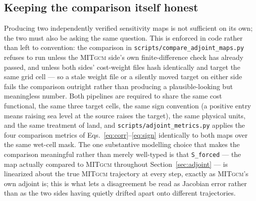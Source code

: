 \documentclass[3p,12pt]{elsarticle}
\newcommand{\MITgcm}{\textsc{MITgcm}}
\begin{document}
\subsection{Keeping the comparison itself honest}
\label{app:trust-shared}

Producing two independently verified sensitivity maps is not sufficient on
its own; the two must also be asking the same question. This is enforced in
code rather than left to convention: the comparison in
\texttt{scripts/compare\_adjoint\_maps.py} refuses to run unless the
\MITgcm{} side's own finite-difference check has already passed, and unless
both sides' cost-weight files hash identically and target the same grid cell
--- so a stale weight file or a silently moved target on either side fails
the comparison outright rather than producing a plausible-looking but
meaningless number. Both pipelines are required to share the same cost
functional, the same three target cells, the same sign convention (a positive
entry means raising sea level at the source raises the target), the same
physical units, and the same treatment of land, and
\texttt{scripts/adjoint\_metrics.py} applies the four comparison metrics of
Eqs.~\eqref{eq:corr}--\eqref{eq:sign} identically to both maps over the same
wet-cell mask. The one substantive modelling choice that makes the
comparison meaningful rather than merely well-typed is that \texttt{S\_forced}
--- the map actually compared to \MITgcm{} throughout Section~\ref{sec:adjoint}
--- is linearized about the true \MITgcm{} trajectory at every step, exactly
as \MITgcm{}'s own adjoint is; this is what lets a disagreement be read as
Jacobian error rather than as the two sides having quietly drifted apart onto
different trajectories.
\end{document}

